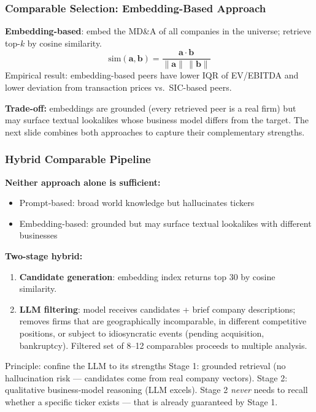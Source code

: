 \documentclass[9pt,t]{beamer}
\begin{document}
\begin{frame}
\frametitle{Comparable Selection: Embedding-Based Approach}

\begin{underhood}
\textbf{Embedding-based}: embed the MD\&A of all companies in the universe; retrieve top-$k$ by cosine similarity.
\[
  \text{sim}(\mathbf{a}, \mathbf{b}) = \frac{\mathbf{a} \cdot \mathbf{b}}{\|\mathbf{a}\|\,\|\mathbf{b}\|}
\]
Empirical result: embedding-based peers have lower IQR of EV/EBITDA and lower deviation from transaction prices vs.\ SIC-based peers.
\end{underhood}

\medskip
\textbf{Trade-off:} embeddings are grounded (every retrieved peer is a real firm) but may
surface textual lookalikes whose business model differs from the target. The next slide
combines both approaches to capture their complementary strengths.
\end{frame}

\begin{frame}
\frametitle{Hybrid Comparable Pipeline}

\textbf{Neither approach alone is sufficient:}
\begin{itemize}
  \item Prompt-based: broad world knowledge but hallucinates tickers
  \item Embedding-based: grounded but may surface textual lookalikes with different businesses
\end{itemize}

\medskip
\textbf{Two-stage hybrid:}
\begin{enumerate}
  \item \textbf{Candidate generation}: embedding index returns top 30 by cosine similarity.
  \item \textbf{LLM filtering}: model receives candidates + brief company descriptions;
        removes firms that are geographically incomparable, in different competitive positions,
        or subject to idiosyncratic events (pending acquisition, bankruptcy).
        Filtered set of 8--12 comparables proceeds to multiple analysis.
\end{enumerate}

\medskip
\begin{block}{Principle: confine the LLM to its strengths}
Stage 1: grounded retrieval (no hallucination risk --- candidates come from real company vectors).
Stage 2: qualitative business-model reasoning (LLM excels).
Stage 2 \emph{never} needs to recall whether a specific ticker exists --- that is already guaranteed by Stage 1.
\end{block}
\end{frame}
\end{document}
